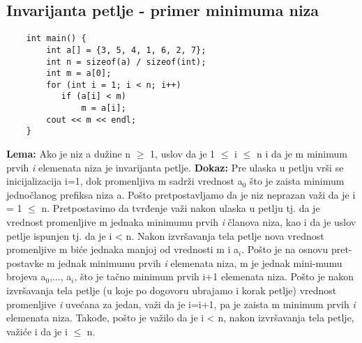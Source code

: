 \documentclass{article}
\begin{document}
\subsection{Invarijanta petlje - primer minimuma niza}
\begin{lstlisting}
    int main() { 
		int a[] = {3, 5, 4, 1, 6, 2, 7}; 
		int n = sizeof(a) / sizeof(int); 
		int m = a[0]; 
		for (int i = 1; i < n; i++) 
		   if (a[i] < m) 
			   m = a[i];
		cout << m << endl; 
	}
\end{lstlisting}
\textbf{Lema:} Ako je niz a dužine n $\geq$ 1, uslov da je 1 $\leq$ i $\leq$ n i da je m minimum prvih \textit{i} elemenata niza je invarijanta petlje.
\newline \hspace*{0.4cm}\textbf{Dokaz:} 
\newline \hspace*{0.8cm}Pre ulaska u petlju vrši se inicijalizacija i=1, dok promenljiva m sadrži \hspace*{0.8cm}vrednost a$_{0}$ što je 	zaista minimum jednočlanog prefiksa niza a. Pošto \hspace*{0.8cm}pretpostavljamo da je niz neprazan važi 	da je i = 1 $\leq$ n.
	Pretpostavimo \hspace*{0.8cm}da tvrđenje važi nakon ulaska u petlju tj. da je vrednost promenljive m 	\hspace*{0.8cm}jednaka minimumu prvih 
	\textit{i} članova niza, kao i da je uslov petlje ispunjen \hspace*{0.8cm}tj. da je i < n. 	Nakon izvršavanja tela petlje nova vrednost promenljive \hspace*{0.8cm}m biće jednaka manjoj od vrednosti 	m i a$_{i}$. Pošto je na osnovu pret-\hspace*{0.8cm}postavke m jednak minimumu prvih \textit{i} elemenata niza, m je 	jednak 	mini-\hspace*{0.8cm}mumu brojeva a$_{0}$,..., a$_{i}$, što je tačno minimum prvih i+1 elemenata niza. \hspace*{0.8cm}Pošto 
	je nakon izvršavanja tela petlje (u koje po dogovoru ubrajamo i korak \hspace*{0.8cm}petlje) vrednost 	promenljive \textit{i} uvećana za jedan, važi da je i=i+1, pa je \hspace*{0.8cm}zaista m minimum prvih \textit{i} elemenata 	
	niza. Takođe, pošto je važilo da je   \hspace*{0.8cm}i < n, nakon izvršavanja tela petlje, važiće i da je i $\leq$ n.
\vspace{0.2cm}	\newline 
\end{document}
